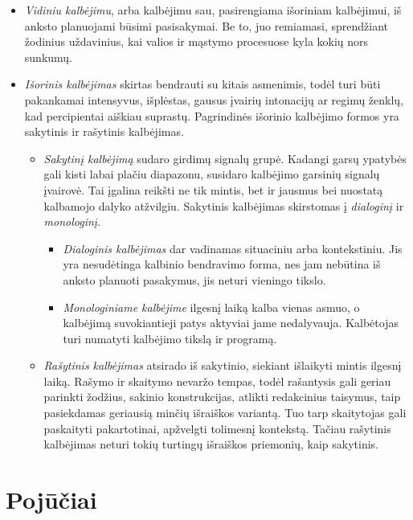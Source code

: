 \begin{itemize}
  \item \emph{Vidiniu kalbėjimu}, arba kalbėjimu sau, pasirengiama 
    išoriniam kalbėjimui, iš anksto planuojami būsimi pasisakymai. Be to, 
    juo remiamasi, sprendžiant žodinius uždavinius, kai valios ir mąstymo 
    procesuose kyla kokių nors sunkumų.
  \item \emph{Išorinis kalbėjimas} skirtas bendrauti su kitais asmenimis,
    todėl turi būti pakankamai intensyvus, išplėstas, gausus įvairių 
    intonacijų ar regimų ženklų, kad percipientai aiškiau suprastų.  
    Pagrindinės išorinio kalbėjimo formos yra sakytinis ir rašytinis 
    kalbėjimas.
    \begin{itemize}
      \item \emph{Sakytinį kalbėjimą} sudaro girdimų signalų grupė. Kadangi 
        garsų ypatybės gali kisti labai plačiu diapazonu, susidaro 
        kalbėjimo garsinių signalų įvairovė. Tai įgalina reikšti ne tik 
        mintis, bet ir jausmus bei nuostatą kalbamojo dalyko atžvilgiu. 
        Sakytinis kalbėjimas skirstomas į \emph{dialoginį} ir 
        \emph{monologinį}.
        \begin{itemize}
          \item \emph{Dialoginis kalbėjimas} dar vadinamas situaciniu arba 
            kontekstiniu. Jis yra nesudėtinga kalbinio bendravimo forma, 
            nes jam nebūtina iš anksto planuoti pasakymus, jis neturi 
            vieningo tikslo.
          \item \emph{Monologiniame kalbėjime} ilgesnį laiką kalba vienas 
            asmuo, o kalbėjimą suvokiantieji patys aktyviai jame 
            nedalyvauja.  Kalbėtojas turi numatyti kalbėjimo tikslą ir 
            programą. 
        \end{itemize}
      \item \emph{Rašytinis kalbėjimas} atsirado iš sakytinio, siekiant 
        išlaikyti mintis ilgesnį laiką. Rašymo ir skaitymo nevaržo tempas, 
        todėl rašantysis gali geriau parinkti žodžius, sakinio 
        konstrukcijas, atlikti redakcinius taisymus, taip pasiekdamas 
        geriausią minčių išraiškos variantą. Tuo tarp skaitytojas gali 
        paskaityti pakartotinai, apžvelgti tolimesnį kontekstą. Tačiau 
        rašytinis kalbėjimas neturi tokių turtingų išraiškos priemonių, 
        kaip sakytinis.
    \end{itemize}
\end{itemize}

\section{Pojūčiai}

